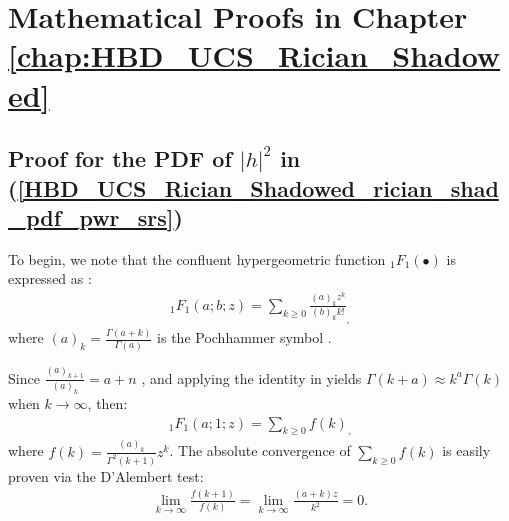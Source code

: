 \chapter{Mathematical Proofs in Chapter \ref{chap:HBD_UCS_Rician_Shadowed}}
\label{chap:Appendix_C}
\section{Proof for the PDF of $|h|^2$ in (\ref{HBD_UCS_Rician_Shadowed_rician_shad_pdf_pwr_srs})} \label{HBD_UCS_Rician_Shadowed_pdf_theorem_proof}
To begin, we note that the confluent hypergeometric function ${}_1{F_1}(\bullet)$ is expressed as \cite{parthasarathy2017coverage}:
\begin{eqnarray}
 {}_1F_1(a;b;z) = \sum_{k\geq0} \frac{(a)_k z^k}{(b)_k k!}_,
\end{eqnarray}
where $(a)_k=\frac{\Gamma(a+k)}{\Gamma(a)}$ is the Pochhammer symbol \cite{chun2017comprehensive}. 

Since $\frac{(a)_{k+1}}{(a)_k}=a+n$ \cite{Boros2004Irresistible}, and applying the identity in \cite[eq. (25)]{rached2017unified} yields $\Gamma(k+a) \approx k^a\Gamma(k)$ when $k \to \infty$, then:
\begin{eqnarray}
{}_1F_1(a;1;z) = \sum_{k\geq0} f(k)_,
\end{eqnarray}
where $f(k) = \frac{(a)_k}{\Gamma^2(k+1)}z^k$. The absolute convergence of $\sum_{k\geq0} f(k)$ is easily proven via the D'Alembert test:
\begin{eqnarray} \label{HBD_UCS_Rician_Shadowed_ratio_test}
\lim_{k\to\infty} \frac{f(k+1)}{f(k)} = \lim_{k\to\infty} \frac{(a+k)z}{k^2} = 0.
\end{eqnarray}

